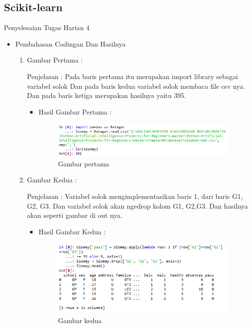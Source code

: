 \subsection{Scikit-learn}
Penyelesaian Tugas Harian 4 
\begin{itemize}
\item Pembahasan Codingan Dan Hasilnya
\begin{enumerate}
\item Gambar Pertama :
\par Penjelasan : Pada baris pertama itu merupakan import library sebagai variabel solok  Dan pada baris kedua variabel solok membaca file csv nya. Dan pada baris ketiga merupakan hasilnya yaitu 395.

\par
\begin{itemize}
\par
\item Hasil  Gambar Pertama :
\par

\begin{figure}[ht]
\centering
\includegraphics[scale=0.6]{figures/AIP/jd1.PNG}
\caption{ Gambar pertama}
\label{1}
\end{figure}

\par
\end{itemize}
\item  Gambar Kedua :
\par Penjelasan : Variabel solok mengimplementasikan baris 1, dari baris G1, G2, G3. Dan variabel solok akan ngedrop kolom G1, G2,G3. Dan hasilnya akan seperti gambar di out nya.
\par 
\begin{itemize}
\par
\item Hasil Gambar Kedua :

\begin{figure}[ht]
\centering
\includegraphics[scale=0.7]{figures/AIP/jd2.PNG}
\caption{Gambar kedua}
\label{2}
\end{figure}


\end{itemize}
\end{enumerate}
\end{itemize}
